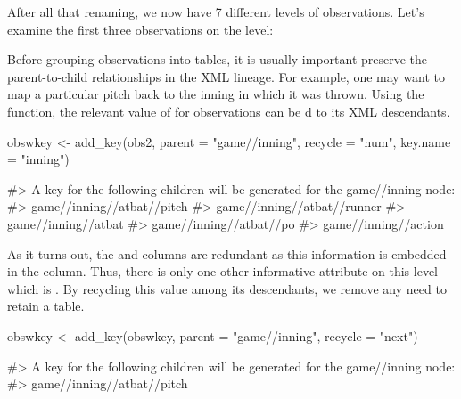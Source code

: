 \begin{article}
After all that renaming, we now have 7
different levels of observations. Let's examine the first three observations
on the  level:
%
\begin{Schunk}
\end{Schunk}
%
Before grouping observations into tables, it is usually important
preserve the parent-to-child relationships in the XML lineage. For
example, one may want to map a particular pitch back to the inning
in which it was thrown. Using the  function, the relevant
value of  for  observations can be
d to its XML descendants.
%
\begin{Schunk}
\begin{Sinput}
obswkey <- add_key(obs2, parent = "game//inning", recycle = "num", key.name = "inning")
\end{Sinput}
\begin{Soutput}
#> A key for the following children will be generated for the game//inning node:
#> game//inning//atbat//pitch
#> game//inning//atbat//runner
#> game//inning//atbat
#> game//inning//atbat//po
#> game//inning//action
\end{Soutput}
\end{Schunk}
%
As it turns out, the  and  columns
are redundant as this information is embedded in the  column.
Thus, there is only one other informative attribute on this level
which is . By recycling this value among its descendants,
we remove any need to retain a  table.
%
\begin{Schunk}
\begin{Sinput}
obswkey <- add_key(obswkey, parent = "game//inning", recycle = "next")
\end{Sinput}
\begin{Soutput}
#> A key for the following children will be generated for the game//inning node:
#> game//inning//atbat//pitch

\end{Soutput}
\end{Schunk}
\end{article}
